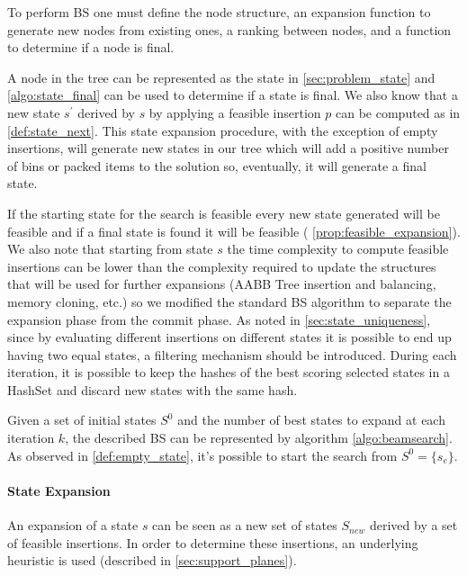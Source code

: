 To perform BS one must define the node structure, an expansion function to generate new nodes from existing ones, a ranking between nodes, and a function to determine if a node is final.

A node in the tree can be represented as the state in \cref{sec:problem_state} and \cref{algo:state_final} can be used to determine if a state is final. We also know that a new state $s^\prime$ derived by $s$ by applying a feasible insertion $p$ can be computed as in \cref{def:state_next}.
This state expansion procedure, with the exception of empty insertions, will generate new states in our tree which will add a positive number of bins or packed items to the solution so, eventually, it will generate a final state.

If the starting state for the search is feasible every new state generated will be feasible and if a final state is found it will be feasible ( \cref{prop:feasible_expansion}).
We also note that starting from state $s$ the time complexity to compute feasible insertions can be lower than the complexity required to update the structures that will be used for further expansions (AABB Tree insertion and balancing, memory cloning, etc.) so we modified the standard BS algorithm to separate the expansion phase from the commit phase.
As noted in \cref{sec:state_uniqueness}, since by evaluating different insertions on different states it is possible to end up having two equal states, a filtering mechanism should be introduced.
During each iteration, it is possible to keep the hashes of the best scoring selected states in a HashSet and discard new states with the same hash.

Given a set of initial states $S^0$ and the number of best states to expand at each iteration $k$, the described BS can be represented by algorithm \ref{algo:beamsearch}.
As observed in \cref{def:empty_state}, it's possible to start the search from $S^0 = \{ s_e \}$.



\paragraph*{State Expansion}

An expansion of a state $s$ can be seen as a new set of states $S_{new}$ derived by a set of feasible insertions.
In order to determine these insertions, an underlying heuristic is used (described in \cref{sec:support_planes}).

